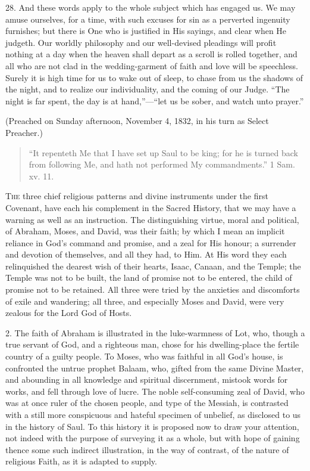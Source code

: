 28. And these words apply to the whole subject which has engaged
us. We may amuse ourselves, for a time, with such excuses for sin as a
perverted ingenuity furnishes; but there is One who is justified in
His sayings, and clear when He judgeth. Our worldly philosophy and our
well-devised pleadings will profit nothing at a day when the heaven
shall depart as a scroll is rolled together, and all who are not clad
in the wedding-garment of faith and love will be speechless. Surely it
is high time for us to wake out of sleep, to chase from us the shadows
of the night, and to realize our individuality, and the coming of our
Judge. ``The night is far spent, the day is at hand,''—``let
us be sober, and watch unto prayer.''

(Preached on Sunday afternoon, November 4, 1832, in his turn as
Select Preacher.)


\begin{quote}

``It repenteth Me that I have set up Saul to be king; for he
is turned back from following Me, and hath not performed My
commandments.'' 1 Sam. xv. 11.

\end{quote}

T\textsc{he} three chief religious patterns and divine instruments under the
first Covenant, have each his complement in the Sacred History, that
we may have a warning as well as an instruction. The distinguishing
virtue, moral and political, of Abraham, Moses, and David, was their
faith; by which I mean an implicit reliance in God's command and
promise, and a zeal for His honour; a surrender and devotion of
themselves, and all they had, to Him. At His word they each
relinquished the dearest wish of their hearts, Isaac, Canaan, and the
Temple; the Temple was not to be built, the land of promise not to be
entered, the child of promise not to be retained. All three were tried
by the anxieties and discomforts of exile and wandering; all three,
and especially Moses and David, were very zealous for the Lord God of
Hosts.

2. The faith of Abraham is illustrated in the luke-warmness of Lot,
who, though a true servant of God, and a righteous man, chose for his
dwelling-place the fertile country of a guilty people. To Moses, who
was faithful in all God's house, is confronted the untrue prophet
Balaam, who, gifted from the same Divine Master, and abounding in all
knowledge and spiritual discernment, mistook words for works, and fell
through love of lucre. The noble self-consuming zeal of David, who was
at once ruler of the chosen people, and type of the Messiah, is
contrasted with a still more conspicuous and hateful specimen of
unbelief, as disclosed to us in the history of Saul. To this history
it is proposed now to draw your attention, not indeed with the purpose
of surveying it as a whole, but with hope of gaining thence some such
indirect illustration, in the way of contrast, of the nature of
religious Faith, as it is adapted to supply.


